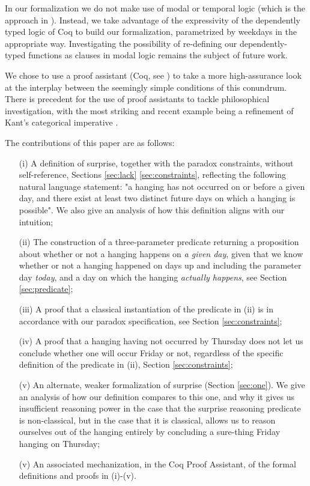 \documentclass[runningheads]{llncs}
\begin{document}
In our formalization we do not make use of modal or temporal logic
(which is the approach in \cite{modalepistemic}).
Instead, we take advantage of the expressivity of the dependently typed logic of Coq to
build our formalization, parametrized by weekdays in the
appropriate way.
Investigating the possibility of re-defining our
dependently-typed functions as clauses in modal logic remains the subject of future work.

We chose to use a proof
assistant (Coq, see \cite{coqmanual}) to take a more high-assurance look at the
interplay between the seemingly simple conditions of this conundrum.
There is precedent for the use of proof assistants to tackle philosophical
investigation, with the most striking and recent example
being a refinement of Kant's categorical imperative \cite{categoricalkant}.

  The contributions of this paper are as follows:

  \begin{itemize}
    \item[(i)] A definition of surprise, together with the paradox
    constraints, without self-reference,
    Sections \ref{sec:lack} \ref{sec:constraints}, reflecting
    the following natural language statement: "a hanging has not occurred on or before a given day,
    and there exist at least two distinct future days on which a hanging
    is possible". We
    also give an analysis of how this definition aligns with our intuition;

    \item[(ii)] The construction of a three-parameter predicate returning a proposition about
    whether or not a hanging happens on \emph{a given day}, given that we know whether or not a hanging
    happened on days up and including the parameter day \emph{today}, and a day on which the hanging
    \emph{actually happens}, see Section \ref{sec:predicate};

    \item[(iii)] A proof that a classical instantiation of the predicate in (ii)
    is in accordance with our paradox specification, see Section \ref{sec:constraints};

    \item[(iv)] A proof that a hanging having not occurred by Thursday does not let
    us conclude whether one will occur Friday or not, regardless of the specific
    definition of the predicate in (ii), Section \ref{sec:constraints};

    \item[(v)] An alternate, weaker formalization of surprise (Section \ref{sec:one}). We give an analysis of how
    our definition compares to this one, and why it gives us insufficient reasoning
    power in the case that the surprise reasoning predicate is non-classical, but
    in the case that it is classical, allows us to reason ourselves out of the hanging entirely by concluding
    a sure-thing Friday hanging on Thursday;

    \item[(v)] An associated mechanization, in the Coq Proof Assistant, of the formal
    definitions and proofs in (i)-(v).
  \end{itemize}
\end{document}
